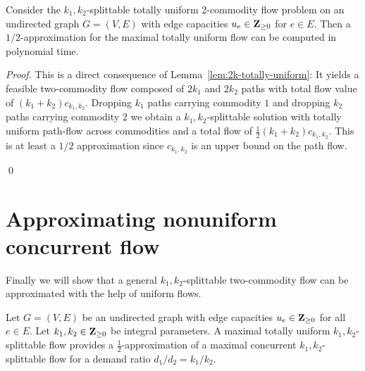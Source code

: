 \begin{theorem}\label{thm:approx-biuniform}
  Consider the
  $k_1,k_2$-splittable totally uniform 2-commodity flow problem on an
  undirected graph $G=(V,E)$  with edge capacities
  $u_e\in\mathbf{Z}_{\geq0}$ for $e\in E$. Then a $1/2$-approximation for the
  maximal totally uniform flow can be computed in polynomial time.
\end{theorem}


\begin{proof}
  This is a direct consequence of
  Lemma~\ref{lem:2k-totally-uniform}: It yields a feasible
  two-commodity flow composed of $2k_1$ and $2k_2$ paths with total
  flow value of $(k_1+k_2)c_{k_1,k_2}$. Dropping $k_1$ paths carrying
  commodity $1$ and dropping $k_2$ paths carrying commodity $2$ we
  obtain a $k_1,k_2$-splittable solution with totally uniform
  path-flow across commodities and a total flow of
  $\tfrac{1}{2}(k_1+k_2)c_{k_1,k_2}$. This is at least a $1/2$
  approximation since $c_{k_1,k_2}$ is an upper bound on the path flow.

\qed \end{proof}

\section{Approximating nonuniform concurrent flow}
\label{sec:appr-nonuniform}

Finally we will show that a general $k_1,k_2$-splittable two-commodity flow
can be approximated with the help of uniform flows.

\begin{theorem}\label{thm:approx-nonuniform}
  Let $G=(V,E)$ be an undirected graph with edge capacities
  $u_e\in\mathbf{Z}_{\geq0}$ for all $e\in E$. Let $k_1,k_2\in\mathbf{Z}_{\geq0}$ be
  integral parameters. A maximal  totally uniform $k_1,k_2$-splittable
  flow provides a $\tfrac{1}{2}$-approximation of a maximal concurrent
  $k_1,k_2$-splittable flow for a demand ratio $d_1/d_2=k_1/k_2$.
\end{theorem}

